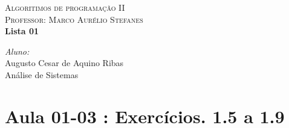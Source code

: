 \documentclass[a4paper,10pt]{article}
\begin{document}
\lstset{language=c,numbers=left,numberstyle=\tiny,breaklines=true,frame=single}

\begin{titlepage}

\begin{center}
\textsc{\LARGE Algoritimos de programação II}\\[0.5cm]
\textsc{Professor: Marco Aurélio Stefanes}\\[2.5cm]
{ \huge \bfseries Lista 01 \\[0.4cm] }
\end{center}
\vspace{10cm}


\begin{minipage}{1.6\textwidth}
\begin{center}
\emph{Aluno:} \\
Augusto Cesar de Aquino Ribas\\
Análise de Sistemas\\
\end{center}
\end{minipage}%

\end{titlepage}

\newpage
\section{Aula 01-03 : Exercícios. 1.5 a 1.9}
\end{document}
